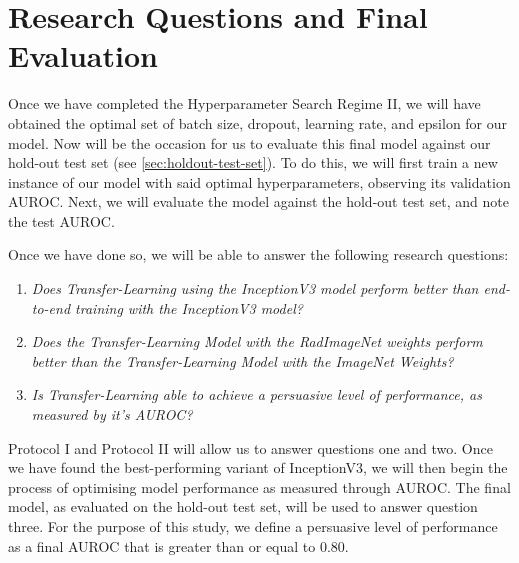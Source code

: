 \section{Research Questions and Final Evaluation}\label{sec:final-evaluation-method}

Once we have completed the Hyperparameter Search Regime II, we will have obtained the optimal set of batch size, dropout, learning rate, and epsilon for our model. Now will be the occasion for us to evaluate this final model against our hold-out test set (see \autoref{sec:holdout-test-set}). To do this, we will first train a new instance of our model with said optimal hyperparameters, observing its validation AUROC. Next, we will evaluate the model against the hold-out test set, and note the test AUROC.

Once we have done so, we will be able to answer the following research questions:

\begin{enumerate}
    \item \emph{Does Transfer-Learning using the InceptionV3 model perform better than end-to-end training with the InceptionV3 model?}
    \item \emph{Does the Transfer-Learning Model with the RadImageNet weights perform better than the Transfer-Learning Model with the ImageNet Weights?}
    \item \emph{Is Transfer-Learning able to achieve a persuasive level of performance, as measured by it's AUROC?}
\end{enumerate}

\noindent
Protocol I and Protocol II will allow us to answer questions one and two. Once we have found the best-performing variant of InceptionV3, we will then begin the process of optimising model performance as measured through AUROC. The final model, as evaluated on the hold-out test set, will be used to answer question three. For the purpose of this study, we define a persuasive level of performance as a final AUROC that is greater than or equal to \(0.80\).



